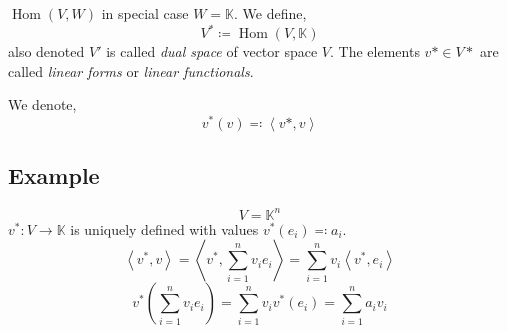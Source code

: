 \documentclass[a4paper,landscape,twocolumn]{article}
\newcommand\functional[1]{\left\langle{#1}\right\rangle}
\DeclareMathOperator\Hom{Hom} %
\begin{document}
%
$\Hom(V,W)$ in special case $W = \mathbb K$. We define,
\[ V^* \coloneqq \Hom(V,\mathbb K) \]
also denoted $V'$ is called \emph{dual space} of vector space $V$.
The elements $v* \in V*$ are called \emph{linear forms} or \emph{linear functionals}.

We denote,
\[ v^*(v) \eqqcolon \functional{v*,v} \]

\subsection{Example}
\[ V = \mathbb K^n \]
$v^*: V \to \mathbb K$ is uniquely defined with values $v^*(e_i) \eqqcolon a_i$.
\[ \functional{v^*,v} = \functional{v^*, \sum_{i=1}^n v_i e_i} = \sum_{i=1}^n v_i \functional{v^*,e_i} \]
\[ v^*\left(\sum_{i=1}^n v_i e_i\right) = \sum_{i=1}^n v_i v^*(e_i) = \sum_{i=1}^n a_i v_i \]
\end{document}
